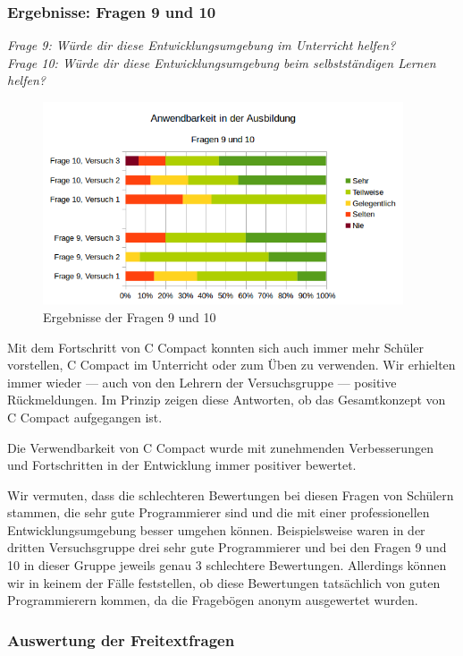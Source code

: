 \subsubsection*{Ergebnisse: Fragen 9 und 10}

\emph{Frage 9: Würde dir diese Entwicklungsumgebung im Unterricht helfen?\\
Frage 10: Würde dir diese Entwicklungsumgebung beim selbstständigen Lernen helfen?}

\begin{figure}[h!]
\centering
\includegraphics[width=0.95\textwidth]{./media/images/gui/trials/gui-f9-10.png}
\caption{Ergebnisse der Fragen 9 und 10}
\end{figure}

Mit dem Fortschritt von C Compact konnten sich auch immer mehr Schüler vorstellen, C Compact im Unterricht oder zum Üben zu verwenden. Wir erhielten immer wieder --- auch von den Lehrern der Versuchsgruppe --- positive Rückmeldungen. Im Prinzip zeigen diese Antworten, ob das Gesamtkonzept von C Compact aufgegangen ist.

Die Verwendbarkeit von C Compact wurde mit zunehmenden Verbesserungen und Fortschritten in der Entwicklung immer positiver bewertet.

Wir vermuten, dass die schlechteren Bewertungen bei diesen Fragen von Schülern stammen, die sehr gute Programmierer sind und die mit einer professionellen Entwicklungsumgebung besser umgehen können. Beispielsweise waren in der dritten Versuchsgruppe drei sehr gute Programmierer und bei den Fragen 9 und 10 in dieser Gruppe jeweils genau 3 schlechtere Bewertungen. Allerdings können wir in keinem der Fälle feststellen, ob diese Bewertungen tatsächlich von guten Programmierern kommen, da die Fragebögen anonym ausgewertet wurden.

\subsubsection*{Auswertung der Freitextfragen}

